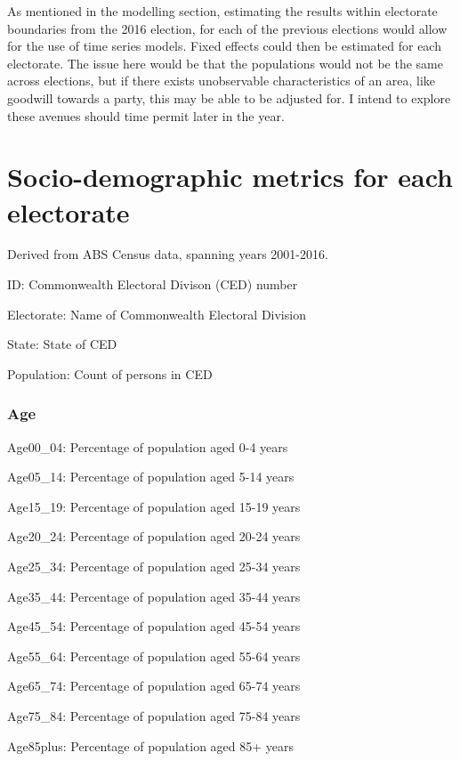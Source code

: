 \documentclass{monashthesis}
\theoremstyle{definition}
\theoremstyle{definition}
\theoremstyle{definition}
\theoremstyle{remark}
\begin{document}
As mentioned in the modelling section, estimating the results within
electorate boundaries from the 2016 election, for each of the previous
elections would allow for the use of time series models. Fixed effects
could then be estimated for each electorate. The issue here would be
that the populations would not be the same across elections, but if
there exists unobservable characteristics of an area, like goodwill
towards a party, this may be able to be adjusted for. I intend to
explore these avenues should time permit later in the year.

\appendix

\chapter{Socio-demographic metrics for each
electorate}\label{socio-demographic-metrics-for-each-electorate}

Derived from ABS Census data, spanning years 2001-2016.

ID: Commonwealth Electoral Divison (CED) number

Electorate: Name of Commonwealth Electoral Division

State: State of CED

Population: Count of persons in CED

\subsection{Age}\label{age}

Age00\_04: Percentage of population aged 0-4 years

Age05\_14: Percentage of population aged 5-14 years

Age15\_19: Percentage of population aged 15-19 years

Age20\_24: Percentage of population aged 20-24 years

Age25\_34: Percentage of population aged 25-34 years

Age35\_44: Percentage of population aged 35-44 years

Age45\_54: Percentage of population aged 45-54 years

Age55\_64: Percentage of population aged 55-64 years

Age65\_74: Percentage of population aged 65-74 years

Age75\_84: Percentage of population aged 75-84 years

Age85plus: Percentage of population aged 85+ years
\end{document}
